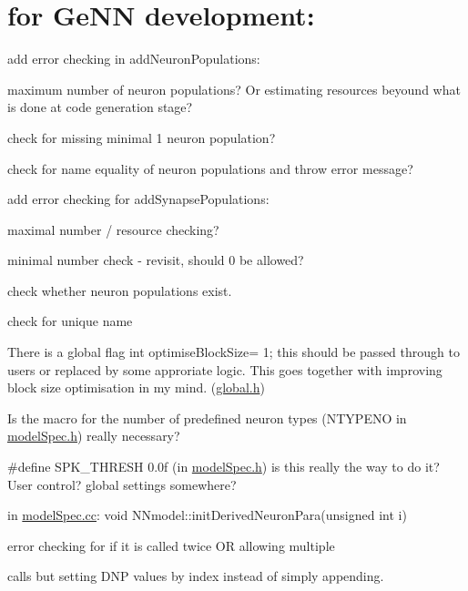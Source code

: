 \hypertarget{Ideas_Ideas}{}\section{for Ge\+N\+N development\+:}\label{Ideas_Ideas}

\begin{DoxyItemize}
\item add error checking in add\+Neuron\+Populations\+:
\begin{DoxyItemize}
\item maximum number of neuron populations? Or estimating resources beyound what is done at code generation stage?
\item check for missing minimal 1 neuron population?
\item check for name equality of neuron populations and throw error message?
\end{DoxyItemize}
\item add error checking for add\+Synapse\+Populations\+:
\begin{DoxyItemize}
\item maximal number / resource checking?
\item minimal number check -\/ revisit, should 0 be allowed?
\item check whether neuron populations exist.
\item check for unique name
\end{DoxyItemize}
\item There is a global flag int optimise\+Block\+Size= 1; this should be passed through to users or replaced by some approriate logic. This goes together with improving block size optimisation in my mind. (\hyperlink{global_8h}{global.\+h})
\item Is the macro for the number of predefined neuron types (N\+T\+Y\+P\+E\+N\+O in \hyperlink{modelSpec_8h}{model\+Spec.\+h}) really necessary?
\item \#define S\+P\+K\+\_\+\+T\+H\+R\+E\+S\+H 0.\+0f (in \hyperlink{modelSpec_8h}{model\+Spec.\+h}) is this really the way to do it? User control? global settings somewhere?
\item in \hyperlink{modelSpec_8cc}{model\+Spec.\+cc}\+: void N\+Nmodel\+::init\+Derived\+Neuron\+Para(unsigned int i)
\begin{DoxyItemize}
\item error checking for if it is called twice O\+R allowing multiple
\item calls but setting D\+N\+P values by index instead of simply appending.

\end{DoxyItemize}
\end{DoxyItemize}
